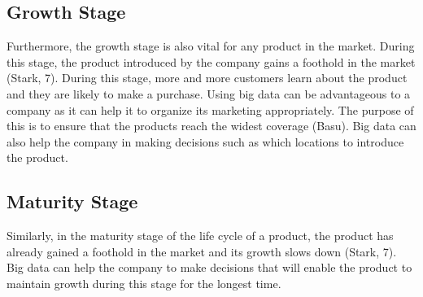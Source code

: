 \documentclass[sigconf]{acmart}
\begin{document}
\subsection{Growth Stage}
Furthermore, the growth stage is also vital for any product in the market. During this stage, the product introduced by the company gains a foothold in the market (Stark, 7). During this stage, more and more customers learn about the product and they are likely to make a purchase. Using big data can be advantageous to a company as it can help it to organize its marketing appropriately. The purpose of this is to ensure that the products reach the widest coverage (Basu). Big data can also help the company in making decisions such as which locations to introduce the product.
\subsection{Maturity Stage}
Similarly, in the maturity stage of the life cycle of a product, the product has already gained a foothold in the market and its growth slows down (Stark, 7). Big data can help the company to make decisions that will enable the product to maintain growth during this stage for the longest time.
\end{document}
